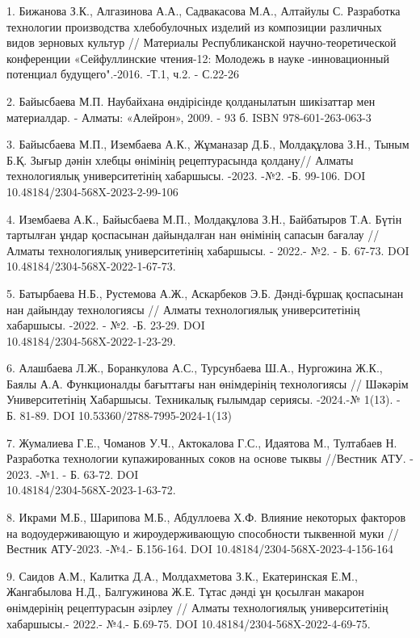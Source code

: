 \begin{references}
1.  Бижанова З.К., Алгазинова А.А., Садвакасова М.А., Алтайулы С. Разработка
технологии производства хлебобулочных изделий из композиции различных
видов зерновых культур // Материалы Республиканской научно-теоретической
конференции «Сейфуллинские чтения-12: Молодежь в науке -инновационный
потенциал будущего".-2016. -Т.1, ч.2. - С.22-26

2.  Байысбаева М.П. Наубайхана өндірісінде қолданылатын шикізаттар мен
материалдар. - Алматы: «Алейрон», 2009. - 93 б. ISBN 978-601-263-063-3

3.  Байысбаева М.П., Изембаева А.К., Жұманазар Д.Б., Молдақұлова З.Н., Тыным
Б.Қ. Зығыр дәнін хлебцы өнімінің рецептурасында қолдану// Алматы
технологиялық университетінің хабаршысы. -2023. -№2. -Б. 99-106. DOI
10.48184/2304-568X-2023-2-99-106

4.  Изембаева А.К., Байысбаева М.П., Молдақұлова З.Н., Байбатыров Т.А. Бүтін
тартылған ұндар қоспасынан дайындалған нан өнімінің сапасын бағалау //
Алматы технологиялық университетінің хабаршысы. - 2022.- №2. - Б. 67-73.
DOI 10.48184/2304-568X-2022-1-67-73.

5.  Батырбаева Н.Б., Рустемова А.Ж., Аскарбеков Э.Б. Дәнді-бұршақ қоспасынан
нан дайындау технологиясы // Алматы технологиялық университетінің
хабаршысы. -2022. - №2. -Б. 23-29. DOI \\10.48184/2304-568X-2022-1-23-29.

6.  Алашбаева Л.Ж., Боранкулова А.С., Турсунбаева Ш.А., Нургожина Ж.К.,
Баялы А.А. Функционалды бағыттағы нан өнімдерінің технологиясы //
Шәкәрім Университетінің Хабаршысы. Техникалық ғылымдар сериясы. -2024.-№
1(13). - Б. 81-89. DOI 10.53360/2788-7995-2024-1(13)

7.  Жумалиева Г.Е., Чоманов У.Ч., Актокалова Г.С., Идаятова М., Тултабаев
Н. Разработка технологии купажированных соков на основе тыквы
//Вестник АТУ. - 2023. -№1. - Б. 63-72. DOI\\
10.48184/2304-568X-2023-1-63-72.

8.  Икрами М.Б., Шарипова М.Б., Абдуллоева Х.Ф. Влияние некоторых факторов
на водоудерживающую и жироудерживающую способности тыквенной муки //
Вестник АТУ-2023. -№4.- Б.156-164. DOI
10.48184/2304-568X-2023-4-156-164

9.  Саидов А.М., Калитка Д.А., Молдахметова З.К., Екатеринская Е.М.,
Жангабылова Н.Д., Балгужинова Ж.Е. Тұтас дәнді ұн қосылған макарон
өнімдерінің рецептурасын әзірлеу // Алматы технологиялық
университетінің хабаршысы.- 2022.- №4.- Б.69-75. DOI
10.48184/2304-568X-2022-4-69-75.


\end{references}
